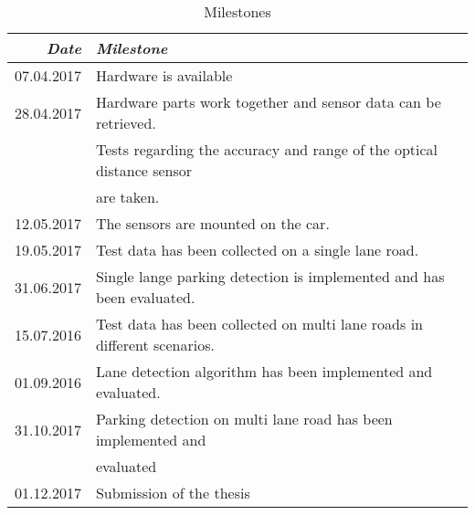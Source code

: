 \documentclass[11pt,a4paper,titlepage,
chapterprefix,headsepline,parskip,pdftex,
,pointlessnumbers,bibtotoc]{article}
\begin{document}
\begin{table}[h]
\centering
\begin{tabular}{r|l}
\emph{Date} & \emph{Milestone} \\\hline
07.04.2017 & Hardware is available \\
28.04.2017 & Hardware parts work together and sensor data can be retrieved. \\
 & Tests regarding the accuracy and range of the optical distance sensor \\
 & are taken. \\
12.05.2017 & The sensors are mounted on the car. \\
19.05.2017 & Test data has been collected on a single lane road. \\
31.06.2017 & Single lange parking detection is implemented and has been evaluated. \\
15.07.2016 & Test data has been collected on multi lane roads in different scenarios. \\
01.09.2016 & Lane detection algorithm has been implemented and evaluated. \\
31.10.2017 & Parking detection on multi lane road has been implemented and \\
 & evaluated \\
01.12.2017 & Submission of the thesis
\end{tabular}
\caption{\label{tab:milestones} Milestones}
\end{table}


%

% 



%
\end{document}
